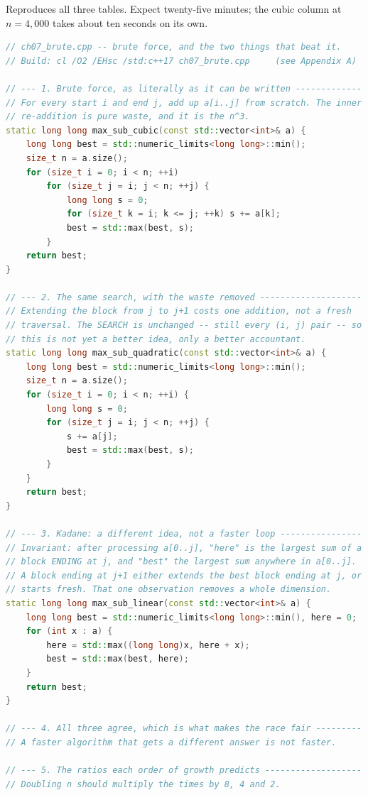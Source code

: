\begin{lab}
Reproduces all three tables. Expect twenty-five minutes; the cubic column at
$n = 4{,}000$ takes about ten seconds on its own.

\begin{lstlisting}[language=C++]
// ch07_brute.cpp -- brute force, and the two things that beat it.
// Build: cl /O2 /EHsc /std:c++17 ch07_brute.cpp     (see Appendix A)

// --- 1. Brute force, as literally as it can be written -------------
// For every start i and end j, add up a[i..j] from scratch. The inner
// re-addition is pure waste, and it is the n^3.
static long long max_sub_cubic(const std::vector<int>& a) {
    long long best = std::numeric_limits<long long>::min();
    size_t n = a.size();
    for (size_t i = 0; i < n; ++i)
        for (size_t j = i; j < n; ++j) {
            long long s = 0;
            for (size_t k = i; k <= j; ++k) s += a[k];
            best = std::max(best, s);
        }
    return best;
}

// --- 2. The same search, with the waste removed --------------------
// Extending the block from j to j+1 costs one addition, not a fresh
// traversal. The SEARCH is unchanged -- still every (i, j) pair -- so
// this is not yet a better idea, only a better accountant.
static long long max_sub_quadratic(const std::vector<int>& a) {
    long long best = std::numeric_limits<long long>::min();
    size_t n = a.size();
    for (size_t i = 0; i < n; ++i) {
        long long s = 0;
        for (size_t j = i; j < n; ++j) {
            s += a[j];
            best = std::max(best, s);
        }
    }
    return best;
}

// --- 3. Kadane: a different idea, not a faster loop ----------------
// Invariant: after processing a[0..j], "here" is the largest sum of a
// block ENDING at j, and "best" the largest sum anywhere in a[0..j].
// A block ending at j+1 either extends the best block ending at j, or
// starts fresh. That one observation removes a whole dimension.
static long long max_sub_linear(const std::vector<int>& a) {
    long long best = std::numeric_limits<long long>::min(), here = 0;
    for (int x : a) {
        here = std::max((long long)x, here + x);
        best = std::max(best, here);
    }
    return best;
}

// --- 4. All three agree, which is what makes the race fair ---------
// A faster algorithm that gets a different answer is not faster.

// --- 5. The ratios each order of growth predicts -------------------
// Doubling n should multiply the times by 8, 4 and 2.


\end{lstlisting}
\end{lab}
